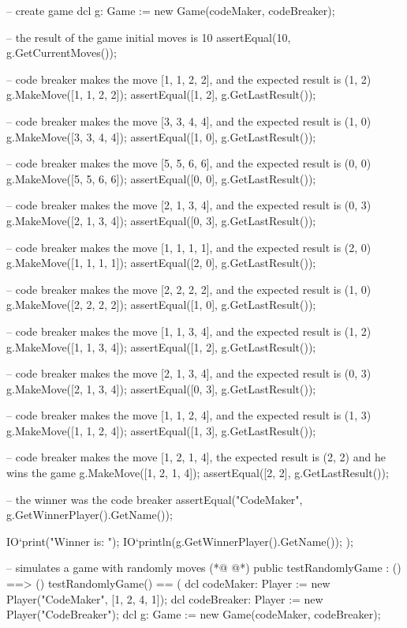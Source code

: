 \begin{vdmpp}[breaklines=true]
    -- create game
    dcl g: Game := new Game(codeMaker, codeBreaker);
    
    -- the result of the game initial moves is 10
    assertEqual(10, g.GetCurrentMoves());
    
    -- code breaker makes the move [1, 1, 2, 2], and the expected result is (1, 2)
    g.MakeMove([1, 1, 2, 2]);
    assertEqual([1, 2], g.GetLastResult());
    
    -- code breaker makes the move [3, 3, 4, 4], and the expected result is (1, 0)
    g.MakeMove([3, 3, 4, 4]);
    assertEqual([1, 0], g.GetLastResult());
    
    -- code breaker makes the move [5, 5, 6, 6], and the expected result is (0, 0)
    g.MakeMove([5, 5, 6, 6]);
    assertEqual([0, 0], g.GetLastResult());
    
    -- code breaker makes the move [2, 1, 3, 4], and the expected result is (0, 3)
    g.MakeMove([2, 1, 3, 4]);
    assertEqual([0, 3], g.GetLastResult());
    
    -- code breaker makes the move [1, 1, 1, 1], and the expected result is (2, 0)
    g.MakeMove([1, 1, 1, 1]);
    assertEqual([2, 0], g.GetLastResult());
    
    -- code breaker makes the move [2, 2, 2, 2], and the expected result is (1, 0)
    g.MakeMove([2, 2, 2, 2]);
    assertEqual([1, 0], g.GetLastResult());
    
    -- code breaker makes the move [1, 1, 3, 4], and the expected result is (1, 2)
    g.MakeMove([1, 1, 3, 4]);
    assertEqual([1, 2], g.GetLastResult());
    
    -- code breaker makes the move [2, 1, 3, 4], and the expected result is (0, 3)
    g.MakeMove([2, 1, 3, 4]);
    assertEqual([0, 3], g.GetLastResult());
    
    -- code breaker makes the move [1, 1, 2, 4], and the expected result is (1, 3)
    g.MakeMove([1, 1, 2, 4]);
    assertEqual([1, 3], g.GetLastResult());
    
    -- code breaker makes the move [1, 2, 1, 4], the expected result is (2, 2) and he wins the game
    g.MakeMove([1, 2, 1, 4]);
    assertEqual([2, 2], g.GetLastResult());
    
    -- the winner was the code breaker
    assertEqual("CodeMaker", g.GetWinnerPlayer().GetName());
    
    IO`print("Winner is: ");
    IO`println(g.GetWinnerPlayer().GetName());
   );
  
  -- simulates a game with randomly moves
(*@
\label{testRandomlyGame:183}
@*)
  public testRandomlyGame : () ==> ()
   testRandomlyGame() == (
    dcl codeMaker: Player := new Player("CodeMaker", [1, 2, 4, 1]);
    dcl codeBreaker: Player := new Player("CodeBreaker");
    dcl g: Game := new Game(codeMaker, codeBreaker);
    

\end{vdmpp}
